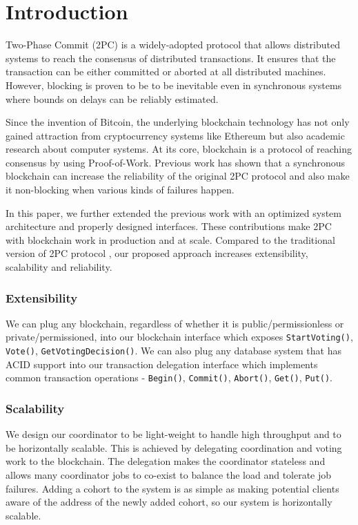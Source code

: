 \documentclass[11pt,sigplan,screen,nonacm]{acmart}
\begin{document}
\section{Introduction}
Two-Phase Commit (2PC) is a widely-adopted protocol that allows distributed systems to reach the consensus of distributed transactions. It ensures that the transaction can be either committed or aborted at all distributed machines. However, blocking is proven \cite{skeen1981nonblocking} to be to be inevitable even in synchronous systems where bounds on delays can be reliably estimated. 

Since the invention of Bitcoin, the underlying blockchain technology has not only gained attraction from  cryptocurrency systems like Ethereum \cite{wood2014ethereum} but also academic research about computer systems. At its core, blockchain  is a protocol of reaching consensus by using Proof-of-Work. Previous work \cite{ezhilchelvan2020non} has shown that a synchronous blockchain can increase the reliability of the original 2PC protocol and also make it non-blocking when various kinds of failures happen.

In this paper, we further extended the previous work with an optimized system architecture and properly designed interfaces. These contributions make 2PC with blockchain work in production and at scale. Compared to the traditional version of 2PC protocol \cite{lampson1993new}, our proposed approach increases extensibility, scalability and reliability.

\subsubsection{Extensibility}
We can plug any blockchain, regardless of whether it is public/permissionless or private/permissioned, into our blockchain interface which exposes \texttt{StartVoting()}, \texttt{Vote()}, \texttt{GetVotingDecision()}. We can also plug any database system that has ACID support into our transaction delegation interface which implements common transaction operations - \texttt{Begin()}, \texttt{Commit()}, \texttt{Abort()}, \texttt{Get()}, \texttt{Put()}.

\subsubsection{Scalability}
We design our coordinator to be light-weight to handle high throughput and to be horizontally scalable. This is achieved by delegating coordination and voting work to the blockchain. The delegation makes the coordinator stateless and allows many coordinator jobs to co-exist to balance the load and tolerate job failures. Adding a cohort to the system is as simple as making potential clients aware of the address of the newly added cohort, so our system is horizontally scalable.
\end{document}

